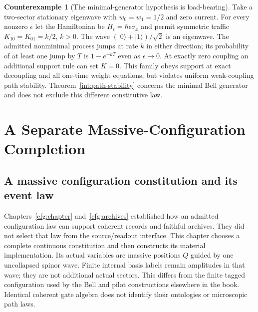 \documentclass[11pt,oneside,openany]{book}
\theoremstyle{definition}
\newtheorem{counterexample}[theorem]{Counterexample}
\theoremstyle{remark}\newtheorem{remark}[theorem]{Remark}
\begin{document}
\begin{counterexample}[The minimal-generator hypothesis is load-bearing]\label{int:nonminimal-boundary}
Take a two-sector stationary eigenwave with $w_0=w_1=1/2$ and zero current. For every nonzero $\epsilon$ let the Hamiltonian be $H_\epsilon=\hbar\epsilon\sigma_x$ and permit symmetric traffic $K_{10}=K_{01}=k/2$, $k>0$. The wave $(|0\rangle+|1\rangle)/\sqrt2$ is an eigenwave. The admitted nonminimal process jumps at rate $k$ in either direction; its probability of at least one jump by $T$ is $1-e^{-kT}$ even as $\epsilon\to0$. At exactly zero coupling an additional support rule can set $K=0$. This family obeys support at exact decoupling and all one-time weight equations, but violates uniform weak-coupling path stability. Theorem~\ref{int:path-stability} concerns the minimal Bell generator and does not exclude this different constitutive law.
\end{counterexample}


\part{A Separate Massive-Configuration Completion}\label{part:massive}


\chapter{A massive configuration constitution and its event law}
\label{mc:chapter-constitution}

Chapters~\ref{cfg:chapter} and~\ref{cfg:archives} established how an
admitted configuration law can support coherent records and faithful
archives. They did not select that law from the source/readout interface.
This chapter chooses a complete continuous constitution and then constructs
its material implementation. Its actual variables are massive positions
$Q$ guided by one uncollapsed spinor wave. Finite internal basis labels
remain amplitudes in that wave; they are not additional actual sectors.
This differs from the finite tagged configuration used by the Bell and
pilot constructions elsewhere in the book. Identical coherent gate algebra
does not identify their ontologies or microscopic path laws.
\end{document}
